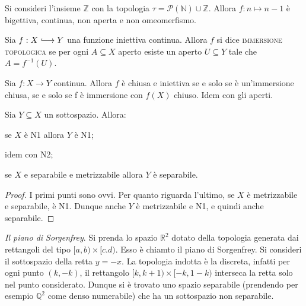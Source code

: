 \documentclass{article}
\begin{document}
\begin{ex}
    Si consideri l'insieme $\mathbb{Z}$ con la topologia $\tau = \mathcal{P}(\mathbb{N})\cup\mathbb{Z}$. Allora $f: n \longmapsto n-1$ \`e bigettiva, continua, non aperta e non omeomerfismo.
\end{ex}

\begin{defn}
    Sia $f:X \hooklongrightarrow Y$ una funzione iniettiva continua. Allora $f$ si dice \textsc{immersione topologica} se per ogni $A \subseteq X$ aperto esiste un aperto $U \subseteq Y$ tale che $A = f^{-1}(U)$.
\end{defn}

\begin{oss}
    Sia $f: X \longrightarrow Y$ continua. Allora $f$ \`e chiusa e iniettiva se e solo se \`e un'immersione chiusa, se e solo se f \`e immersione con $f(X)$ chiuso. Idem con gli aperti.
\end{oss}

\begin{oss}
    Sia $Y \subseteq X$ un sottospazio. Allora:
    \begin{nlist}
        \item se $X$ \`e N1 allora $Y$ \`e N1;

        \item idem con N2;

        \item se $X$ e separabile e metrizzabile allora $Y$ \`e separabile.
    \end{nlist}
\end{oss}

\begin{proof}
    I primi punti sono ovvi. Per quanto riguarda l'ultimo, se $X$ \`e metrizzabile e separabile, \`e N1. Dunque anche $Y$ \`e metrizzabile e N1, e quindi anche separabile.
\end{proof}

\begin{ex}
    \emph{Il piano di Sorgenfrey}. Si prenda lo spazio $\mathbb{R}^2$ dotato della topologia generata dai rettangoli del tipo ${[a,b) \times [c.d)}$. Esso \`e chiamto il piano di Sorgenfrey. Si consideri il sottospazio della retta $y=-x$. La topologia indotta \`e la discreta, infatti per ogni punto $(k, -k)$, il rettangolo ${[k, k+1)\times[-k, 1-k)}$ interseca la retta solo nel punto considerato. Dunque si \`e trovato uno spazio separabile (prendendo per esempio $\mathbb{Q}^2$ come denso numerabile) che ha un sottospazio non separabile.
\end{ex}
\end{document}
